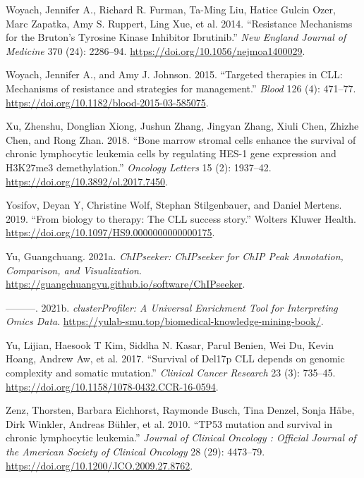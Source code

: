 \documentclass[11pt, a4paper, twosided]{book}
\newenvironment{CSLReferences}%
  {}%
  {\par}
\begin{document}
\begin{CSLReferences}{1}{0}
\leavevmode{}%
Woyach, Jennifer A., Richard R. Furman, Ta-Ming Liu, Hatice Gulcin Ozer, Marc Zapatka, Amy S. Ruppert, Ling Xue, et al. 2014. {``{Resistance Mechanisms for the Bruton's Tyrosine Kinase Inhibitor Ibrutinib}.''} \emph{New England Journal of Medicine} 370 (24): 2286--94. \url{https://doi.org/10.1056/nejmoa1400029}.

\leavevmode{}%
Woyach, Jennifer A., and Amy J. Johnson. 2015. {``{Targeted therapies in CLL: Mechanisms of resistance and strategies for management}.''} \emph{Blood} 126 (4): 471--77. \url{https://doi.org/10.1182/blood-2015-03-585075}.

\leavevmode{}%
Xu, Zhenshu, Donglian Xiong, Jushun Zhang, Jingyan Zhang, Xiuli Chen, Zhizhe Chen, and Rong Zhan. 2018. {``{Bone marrow stromal cells enhance the survival of chronic lymphocytic leukemia cells by regulating HES-1 gene expression and H3K27me3 demethylation}.''} \emph{Oncology Letters} 15 (2): 1937--42. \url{https://doi.org/10.3892/ol.2017.7450}.

\leavevmode{}%
Yosifov, Deyan Y, Christine Wolf, Stephan Stilgenbauer, and Daniel Mertens. 2019. {``{From biology to therapy: The CLL success story}.''} Wolters Kluwer Health. \url{https://doi.org/10.1097/HS9.0000000000000175}.

\leavevmode{}%
Yu, Guangchuang. 2021a. \emph{ChIPseeker: ChIPseeker for ChIP Peak Annotation, Comparison, and Visualization}. \url{https://guangchuangyu.github.io/software/ChIPseeker}.

\leavevmode{}%
---------. 2021b. \emph{clusterProfiler: A Universal Enrichment Tool for Interpreting Omics Data}. \url{https://yulab-smu.top/biomedical-knowledge-mining-book/}.

\leavevmode{}%
Yu, Lijian, Haesook T Kim, Siddha N. Kasar, Parul Benien, Wei Du, Kevin Hoang, Andrew Aw, et al. 2017. {``{Survival of Del17p CLL depends on genomic complexity and somatic mutation}.''} \emph{Clinical Cancer Research} 23 (3): 735--45. \url{https://doi.org/10.1158/1078-0432.CCR-16-0594}.

\leavevmode{}%
Zenz, Thorsten, Barbara Eichhorst, Raymonde Busch, Tina Denzel, Sonja Häbe, Dirk Winkler, Andreas Bühler, et al. 2010. {``{TP53 mutation and survival in chronic lymphocytic leukemia.}''} \emph{Journal of Clinical Oncology : Official Journal of the American Society of Clinical Oncology} 28 (29): 4473--79. \url{https://doi.org/10.1200/JCO.2009.27.8762}.


\end{CSLReferences}
\end{document}
